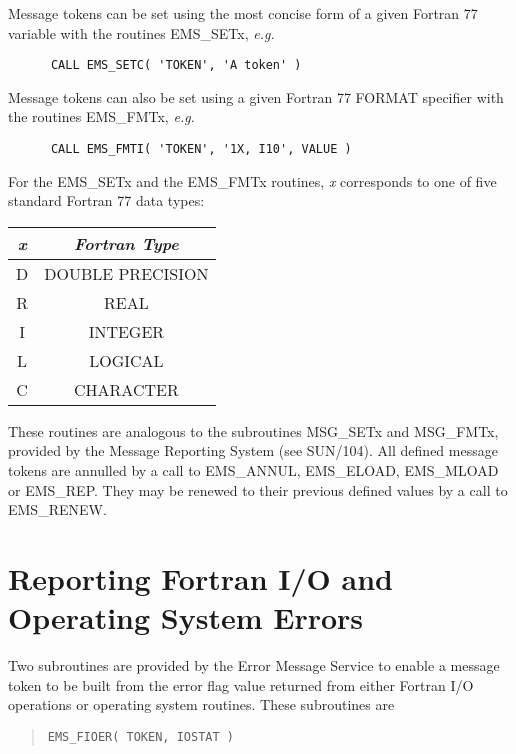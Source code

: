 Message tokens can be set using the most concise form of a given Fortran 77
variable with the routines EMS\_SETx, {\em e.g.}

\begin{verbatim}
      CALL EMS_SETC( 'TOKEN', 'A token' )
\end{verbatim}

Message tokens can also be set using a given Fortran 77 FORMAT specifier with 
the routines EMS\_FMTx, {\em e.g.}

\begin{verbatim}
      CALL EMS_FMTI( 'TOKEN', '1X, I10', VALUE )
\end{verbatim}

For the EMS\_SETx and the EMS\_FMTx routines, {\em x} corresponds to one of 
five standard Fortran 77 data types:

\begin {center}
\begin {tabular}{||c|c||}
\hline
{\em x} & {\em Fortran Type}\\
\hline
D & DOUBLE PRECISION\\
R & REAL\\
I & INTEGER\\
L & LOGICAL\\
C & CHARACTER\\
\hline
\end {tabular}
\end {center}

These routines are analogous to the subroutines MSG\_SETx and MSG\_FMTx,
provided by the Message Reporting System (see SUN/104). 
All defined message tokens are annulled by a call to EMS\_ANNUL, EMS\_ELOAD,
EMS\_MLOAD or EMS\_REP.
They may be renewed to their previous defined values by a call to EMS\_RENEW.


\section {Reporting Fortran I/O and Operating System Errors}

Two subroutines are provided by the Error Message Service to enable a message
token to be built from the error flag value returned from either Fortran I/O
operations or operating system routines.
These subroutines are

\begin {quote}
\begin{verbatim}
EMS_FIOER( TOKEN, IOSTAT )
\end{verbatim}
\end {quote}

